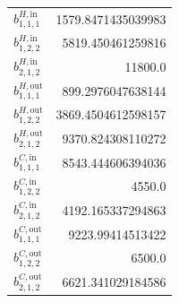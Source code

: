 \documentclass{article}%
\begin{document}
\begin{multicols*}{3}
\begin{supertabular}{lr}
	$b_{1,1,1}^{H,\text{in}}$ & 1579.8471435039983 \\%
	$b_{1,2,2}^{H,\text{in}}$ & 5819.450461259816 \\%
	$b_{2,1,2}^{H,\text{in}}$ & 11800.0 \\%
	$b_{1,1,1}^{H,\text{out}}$ & 899.2976047638144 \\%
	$b_{1,2,2}^{H,\text{out}}$ & 3869.4504612598157 \\%
	$b_{2,1,2}^{H,\text{out}}$ & 9370.824308110272 \\%
	$b_{1,1,1}^{C,\text{in}}$ & 8543.444606394036 \\%
	$b_{1,2,2}^{C,\text{in}}$ & 4550.0 \\%
	$b_{2,1,2}^{C,\text{in}}$ & 4192.165337294863 \\%
	$b_{1,1,1}^{C,\text{out}}$ & 9223.99414513422 \\%
	$b_{1,2,2}^{C,\text{out}}$ & 6500.0 \\%
	$b_{2,1,2}^{C,\text{out}}$ & 6621.341029184586 \\%
\end{supertabular}%
\end{multicols*}%
\clearpage%
\end{document}

